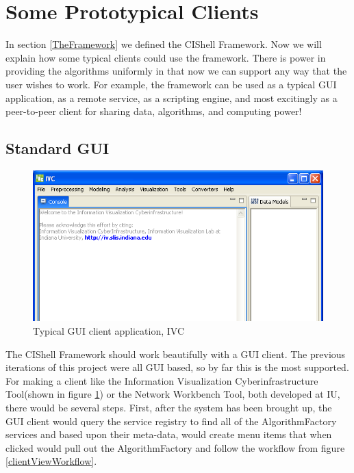 \documentclass[a4]{article}
\begin{document}
\section{Some Prototypical Clients}
\label{TheClients}

In section \ref{TheFramework} we defined the CIShell Framework. Now we will 
explain how some typical clients could use the framework. There is power in 
providing the algorithms uniformly in that now we can support any way that the 
user wishes to work. For example, the framework can be used as a typical GUI 
application, as a remote service, as a scripting engine, and most excitingly as 
a peer-to-peer client for sharing data, algorithms, and computing power!

\subsection{Standard GUI}

\begin{figure}
\centering
\includegraphics[width=120mm]{graphics/guiApplication.png}
\caption{Typical GUI client application, IVC}
\label{guiApplication}
\end{figure}


The CIShell Framework should work beautifully with a GUI client. The previous 
iterations of this project were all GUI based, so by far this is the most 
supported. For making a client like the Information Visualization 
Cyberinfrastructure Tool\footnotemark[5] (shown in figure \ref{guiApplication}) 
or the Network Workbench Tool\footnotemark[6], both developed at IU, there 
would be several steps. First, after the system has been brought up, the GUI 
client would query the service registry to find all of the AlgorithmFactory 
services and based upon their meta-data, would create menu items that when 
clicked would pull out the AlgorithmFactory and follow the workflow from figure 
\ref{clientViewWorkflow}.
\end{document}
